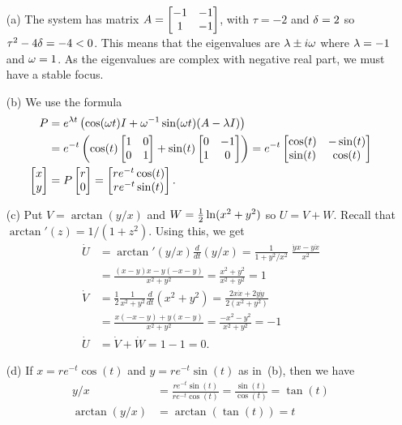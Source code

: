 \documentclass[a4paper]{amsart}
\begin{document}
\begin{solution}\leavevmode
 \begin{itemize}
  \item[(a)] The system has matrix $A=\left[\begin{matrix} -1&-1\\1&-1\end{matrix}\right]$, with
   $\tau=-2$ and $\delta=2$ so $\tau^2-4\delta=-4<0$.  This means that the
   eigenvalues are $\lambda\pm i\omega$ where $\lambda=-1$ and $\omega=1$.  As the
   eigenvalues are complex with negative real part, we must have a
   stable focus.
  \item[(b)] We use the formula
   \begin{align*}
    P &= e^{\lambda t}\left(\cos(\omega t)I + \omega^{-1}\sin(\omega t)(A-\lambda I)\right) \\
      &= e^{-t}\left(
               \cos(t)\left[\begin{matrix} 1&0 \\ 0& 1\end{matrix}\right] + 
               \sin(t)\left[\begin{matrix} 0 & -1 \\ 1 & 0\end{matrix}\right] 
              \right)
       = e^{-t} \left[\begin{matrix} \cos(t) & -\sin(t) \\ \sin(t) & \cos(t) \end{matrix}\right] \\
    \left[\begin{matrix} x\\ y\end{matrix}\right] &= P\left[\begin{matrix} r \\ 0 \end{matrix}\right] 
       = \left[\begin{matrix} r e^{-t} \cos(t) \\ r e^{-t}\sin(t) \end{matrix}\right].
   \end{align*}
  \item[(c)] Put $V=\arctan(y/x)$ and $W=\tfrac{1}{2}\ln(x^2+y^2)$ so
   $U=V+W$.  Recall that $\arctan'(z)=1/(1+z^2)$.  Using this, we get 
   \begin{align*}
    \dot{U}
     &= \arctan'(y/x)\frac{d}{dt}(y/x) 
      = \frac{1}{1+y^2/x^2} \;\frac{\dot{y}x-y\dot{x}}{x^2} \\
     &= \frac{(x-y)x-y(-x-y)}{x^2+y^2}
      = \frac{x^2+y^2}{x^2+y^2} = 1 \\
    \dot{V} 
     &= \frac{1}{2} \frac{1}{x^2+y^2} \frac{d}{dt}(x^2+y^2) 
      = \frac{2x\dot{x}+2y\dot{y}}{2(x^2+y^2)} \\
     &= \frac{x(-x-y)+y(x-y)}{x^2+y^2} 
      = \frac{-x^2-y^2}{x^2+y^2} = -1 \\
    \dot{U} &= \dot{V}+\dot{W} = 1 - 1 = 0.
   \end{align*}
  \item[(d)] If $x=re^{-t}\cos(t)$ and $y=re^{-t}\sin(t)$ as in~(b),
   then we have
   \begin{align*}
    y/x &= \frac{re^{-t}\sin(t)}{re^{-t}\cos(t)}
         = \frac{\sin(t)}{\cos(t)} = \tan(t) \\
    \arctan(y/x) &= \arctan(\tan(t)) = t \\

\end{align*}
\end{itemize}
\end{solution}
\end{document}
